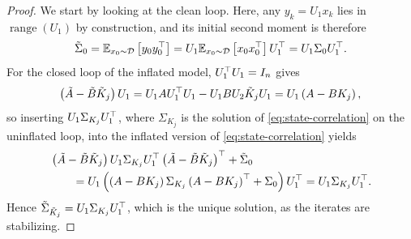 \begin{proof}
We start by looking at the clean loop. Here, any $y_k = U_1 x_k$ lies in $\operatorname{range}(U_1)$ by construction,
and its initial second moment is therefore
\begin{equation*}
    \tilde{\Sigma}_0 = \mathbb{E}_{x_0 \sim \mathcal{D}} \left[ y_0 y_0^{\top} \right] = U_1 \mathbb{E}_{x_0 \sim \mathcal{D}} \left[ x_0 x_0^{\top} \right] U_1^{\top}
    = U_1 \Sigma_0 U_1^{\top} .
\end{equation*}
For the closed loop of the inflated model, $U_1^{\top} U_1 = I_n$ gives
\begin{equation*}
    \left( \tilde{A} - \tilde{B} \tilde{K}_j \right) U_1
    = U_1 A U_1^{\top} U_1 - U_1 B U_2 \tilde{K}_j U_1
    = U_1 \left( A - B K_j \right) ,
\end{equation*}
so inserting
$U_1 \Sigma_{K_j} U_1^{\top}$, where $\Sigma_{K_j}$ is the solution of \eqref{eq:state-correlation} on the uninflated loop, into the
inflated version of \eqref{eq:state-correlation} yields
\begin{align*}
    &\left( \tilde{A} - \tilde{B} \tilde{K}_j \right) U_1 \Sigma_{K_j} U_1^{\top} \left( \tilde{A} - \tilde{B} \tilde{K}_j \right)^{\top} + \tilde{\Sigma}_0 \\
    &\qquad = U_1 \left( \left( A - B K_j \right) \Sigma_{K_j} \left( A - B K_j \right)^{\top} + \Sigma_0 \right) U_1^{\top}
    = U_1 \Sigma_{K_j} U_1^{\top} .
\end{align*}
Hence $\tilde{\Sigma}_{\tilde{K}_j} = U_1 \Sigma_{K_j} U_1^{\top}$, which is the unique solution, as the iterates are stabilizing.


\end{proof}
